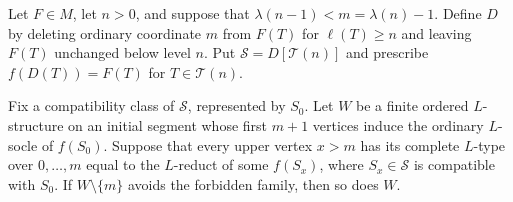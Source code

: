 \begin{lemma}\label{lem:m2-compatible-age}
Let $F\in M$, let $n>0$, and suppose that
$\lambda(n-1)<m=\lambda(n)-1$.  Define $D$ by deleting ordinary
coordinate $m$ from $F(T)$ for $\ell(T)\geq n$ and leaving $F(T)$
unchanged below level $n$.  Put
$\mathcal S=D[\mathcal T(n)]$ and prescribe
$f(D(T))=F(T)$ for $T\in\mathcal T(n)$.

Fix a compatibility class of $\mathcal S$, represented by $S_0$.
Let $W$ be a finite ordered $L$-structure on an initial segment
whose first $m+1$ vertices induce the ordinary $L$-socle of $f(S_0)$.
Suppose that every upper vertex $x>m$ has its complete $L$-type over
$0,\ldots,m$ equal to the $L$-reduct of some $f(S_x)$, where
$S_x\in\mathcal S$ is compatible with $S_0$.  If
$W\setminus\{m\}$ avoids the forbidden family, then so does $W$.
\end{lemma}
